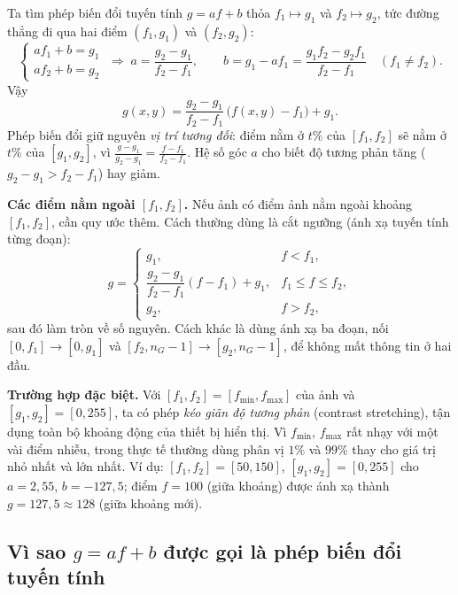 Ta tìm phép biến đổi tuyến tính $g = a f + b$ thỏa $f_1 \mapsto g_1$ và $f_2 \mapsto g_2$, tức đường thẳng đi qua hai điểm $(f_1, g_1)$ và $(f_2, g_2)$:
\begin{equation}
\begin{cases} a f_1 + b = g_1 \\ a f_2 + b = g_2 \end{cases}
\;\Rightarrow\;
a = \frac{g_2 - g_1}{f_2 - f_1}, \qquad b = g_1 - a f_1 = \frac{g_1 f_2 - g_2 f_1}{f_2 - f_1} \quad (f_1 \ne f_2).
\end{equation}
Vậy
\begin{equation}
g(x, y) = \frac{g_2 - g_1}{f_2 - f_1}\,\big(f(x, y) - f_1\big) + g_1.
\label{eq:w5_range_map}
\end{equation}
Phép biến đổi giữ nguyên \emph{vị trí tương đối}: điểm nằm ở $t\%$ của $[f_1, f_2]$ sẽ nằm ở $t\%$ của $[g_1, g_2]$, vì $\frac{g - g_1}{g_2 - g_1} = \frac{f - f_1}{f_2 - f_1}$. Hệ số góc $a$ cho biết độ tương phản tăng ($g_2 - g_1 > f_2 - f_1$) hay giảm.

\textbf{Các điểm nằm ngoài $[f_1, f_2]$.} Nếu ảnh có điểm ảnh nằm ngoài khoảng $[f_1, f_2]$, cần quy ước thêm. Cách thường dùng là cắt ngưỡng (ánh xạ tuyến tính từng đoạn):
\begin{equation}
g = \begin{cases}
g_1, & f < f_1, \\
\dfrac{g_2 - g_1}{f_2 - f_1}(f - f_1) + g_1, & f_1 \le f \le f_2, \\
g_2, & f > f_2,
\end{cases}
\end{equation}
sau đó làm tròn về số nguyên. Cách khác là dùng ánh xạ ba đoạn, nối $[0, f_1] \to [0, g_1]$ và $[f_2, n_G - 1] \to [g_2, n_G - 1]$, để không mất thông tin ở hai đầu.

\textbf{Trường hợp đặc biệt.} Với $[f_1, f_2] = [f_{\min}, f_{\max}]$ của ảnh và $[g_1, g_2] = [0, 255]$, ta có phép \emph{kéo giãn độ tương phản} (contrast stretching), tận dụng toàn bộ khoảng động của thiết bị hiển thị. Vì $f_{\min}$, $f_{\max}$ rất nhạy với một vài điểm nhiễu, trong thực tế thường dùng phân vị $1\%$ và $99\%$ thay cho giá trị nhỏ nhất và lớn nhất. Ví dụ: $[f_1, f_2] = [50, 150]$, $[g_1, g_2] = [0, 255]$ cho $a = 2{,}55$, $b = -127{,}5$; điểm $f = 100$ (giữa khoảng) được ánh xạ thành $g = 127{,}5 \approx 128$ (giữa khoảng mới).

\subsection{Vì sao \texorpdfstring{$g = a f + b$}{g = af + b} được gọi là phép biến đổi tuyến tính}
\label{subsec:w5_why_linear}

